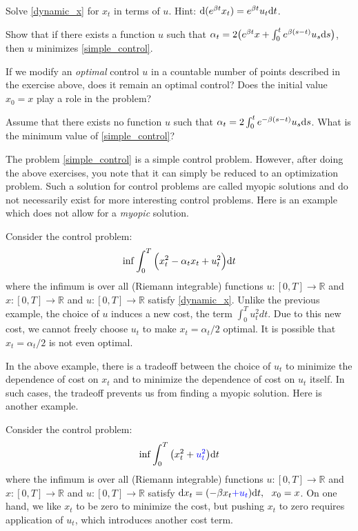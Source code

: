 \documentclass[11pt]{book}
\newcommand{\dd}{\text{\normalfont d}}
\newcommand{\dt}{\text{\normalfont d}t}
\newcommand{\ds}{\text{\normalfont d}s}
\newcommand{\dx}{\text{\normalfont d}x}
\begin{document}
\begin{ex}
Solve \eqref{dynamic_x} for $x_t$ in terms of $u$. Hint: $\dd(e^{\beta t}x_t)=e^{\beta t}u_t{\dt}$.
\end{ex}
\begin{ex}
Show that if there exists a function $u$ such that $\alpha_t=2\big(e^{\beta t}x+\int_0^te^{\beta (s-t)}u_s {{\ds}}\big)$, then $u$ minimizes \eqref{simple_control}.
\end{ex}
\begin{ex}
    If we modify an \emph{optimal} control $u$ in a countable number of points described in the exercise above, does it remain an optimal control? Does the initial value $x_0=x$ play a role in the problem?
\end{ex}
\begin{ex}
Assume that there exists no function $u$ such that $\alpha_t=2\int_0^te^{-\beta (s-t)}u_s {{\ds}}$. What is the minimum value of \eqref{simple_control}?
\end{ex}

The problem \eqref{simple_control} is a simple control problem. However, after doing the above exercises, you note that it can simply be reduced to an optimization problem. Such a solution for control problems are called myopic solutions and do not necessarily exist for more interesting control problems. Here is an example which does not allow for a \emph{myopic} solution.
\begin{eg}
    Consider the control problem: \begin{equation}\label{cost_u}
        \inf \int_0^T\Big(x_t^2 - \alpha_t x_t + u_t^2 \Big) {\dt} 
    \end{equation}
where the infimum is over all (Riemann integrable) functions $u:[0,T]\to\mathbb{R}$ and $x:[0,T]\to\mathbb{R}$ and ${u:[0,T]\to\mathbb{R}}$ satisfy  \eqref{dynamic_x}. Unlike the previous example, the choice of $u$ induces a new cost, the term $\int_0^T u_t^2 dt$. Due to this new cost, we cannot freely choose $u_t$ to make $x_t=\alpha_t/2$ optimal. It is possible that $x_t=\alpha_t/2$ is not even optimal. 
\end{eg}
In the above example, there is a tradeoff between the choice of $u_t$ to minimize the  dependence of cost on $x_t$ and to minimize  the dependence of cost on $u_t$ itself. In such cases, the tradeoff prevents us from finding a myopic solution. Here is another example.
\begin{eg}
    Consider the control problem: \begin{equation}
        \inf \int_0^T \big(x_t^2+{\color{blue}u_t^2}\big)  {\dt} 
    \end{equation}
    where the infimum is over all (Riemann integrable) functions $u:[0,T]\to\mathbb{R}$ and $x:[0,T]\to\mathbb{R}$ and ${u:[0,T]\to\mathbb{R}}$ satisfy  ${\dx}_t = (-\beta x_t  {\color{blue}+ u_t}) {\dt}, ~~ x_0=x$. 
    On one hand, we like $x_t$ to be zero to minimize the cost, but pushing $x_t$ to zero requires application of $u_t$, which introduces another cost term.
\end{eg}
\end{document}
